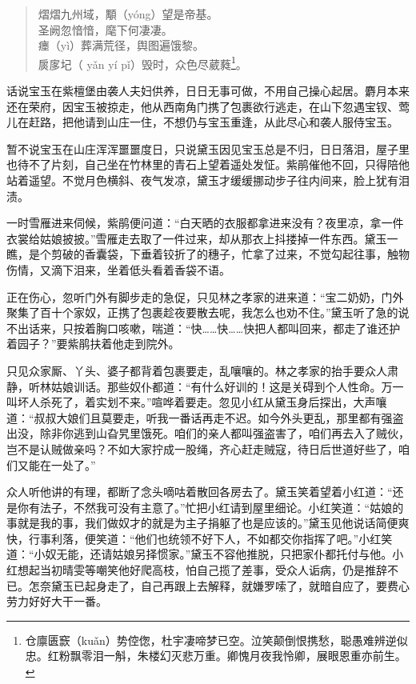 \documentclass[12pt,oneside]{book}
\newenvironment{shici}{%
\begin{verse}%
\centering\large\hspace{12pt}}%
{\end{verse}}
\begin{document}
\begin{shici}
熠熠九州域，顒（yóng）望是帝基。\\
圣阙忽愔愔，麾下何凄凄。\\
瘗（yì）葬满荒径，舆图遍饿黎。\\
扊扅圮（ yǎn yí pǐ）毁时，众色尽葳蕤\footnote{仓廪匮窾（kuǎn）势倥偬，杜宇凄啼梦已空。泣笑颠倒恨携愁，聪愚难辨逆似忠。红粉飘零泪一斛，朱楼幻灭悲万重。卿愧月夜我怜卿，展眼恩重亦前生。}。
\end{shici}


话说宝玉在紫檀堡由袭人夫妇供养，日日无事可做，不用自己操心起居。麝月本来还在荣府，因宝玉被掠走，他从西南角门携了包裹欲行逃走，在山下忽遇宝钗、莺儿在赶路，把他请到山庄一住，不想仍与宝玉重逢，从此尽心和袭人服侍宝玉。

暂不说宝玉在山庄浑浑噩噩度日，只说黛玉因见宝玉总是不归，日日落泪，屋子里也待不了片刻，自己坐在竹林里的青石上望着遥处发怔。紫鹃催他不回，只得陪他站着遥望。不觉月色横斜、夜气发凉，黛玉才缓缓挪动步子往内间来，脸上犹有泪渍。

一时雪雁进来伺候，紫鹃便问道：“白天晒的衣服都拿进来没有？夜里凉，拿一件衣裳给姑娘披披。”雪雁走去取了一件过来，却从那衣上抖搂掉一件东西。黛玉一瞧，是个剪破的香囊袋，下垂着铰折了的穗子，忙拿了过来，不觉勾起往事，触物伤情，又滴下泪来，坐着低头看着香袋不语。

正在伤心，忽听门外有脚步走的急促，只见林之孝家的进来道：“宝二奶奶，门外聚集了百十个家奴，正携了包裹趁夜要散去呢，我怎么也劝不住。”黛玉听了急的说不出话来，只按着胸口咳嗽，喘道：“快……快……快把人都叫回来，都走了谁还护着园子？”要紫鹃扶着他走到院外。

只见众家厮、丫头、婆子都背着包裹要走，乱嚷嚷的。林之孝家的抬手要众人肃静，听林姑娘训话。那些奴仆都道：“有什么好训的！这是关碍到个人性命。万一叫坏人杀死了，着实划不来。”喧哗着要走。忽见小红从黛玉身后探出，大声嚷道：“叔叔大娘们且莫要走，听我一番话再走不迟。如今外头更乱，那里都有强盗出没，除非你逃到山旮旯里饿死。咱们的亲人都叫强盗害了，咱们再去入了贼伙，岂不是认贼做亲吗？不如大家拧成一股绳，齐心赶走贼寇，待日后世道好些了，咱们又能在一处了。”

众人听他讲的有理，都断了念头嘀咕着散回各房去了。黛玉笑着望着小红道：“还是你有法子，不然我可没有主意了。”忙把小红请到屋里细论。小红笑道：“姑娘的事就是我的事，我们做奴才的就是为主子捐躯了也是应该的。”黛玉见他说话简便爽快，行事利落，便笑道：“他们也统领不好下人，不如都交你指挥了吧。”小红笑道：“小奴无能，还请姑娘另择惯家。”黛玉不容他推脱，只把家仆都托付与他。小红想起当初晴雯等嘲笑他好爬高枝，怕自己揽了差事，受众人诟病，仍是推辞不已。怎奈黛玉已起身走了，自己再跟上去解释，就嫌罗嗦了，就暗自应了，要费心劳力好好大干一番。
\end{document}

